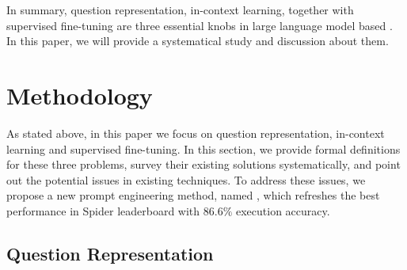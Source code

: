 In summary, question representation, in-context learning, together with supervised fine-tuning are three essential knobs in large language model based \nlsql. 
In this paper, we will provide a systematical study and discussion about them. 
\section{Methodology}

As stated above, in this paper we focus on question representation, in-context learning and supervised fine-tuning. 
In this section, we provide formal definitions for these three problems, survey their existing solutions systematically, and point out the potential issues in existing techniques. 
To address these issues, we propose a new \nlsql prompt engineering method, named \ours, which refreshes the best performance in Spider leaderboard with $86.6\%$ execution accuracy. 

\subsection{Question Representation}
\label{subsec:question_representation}

